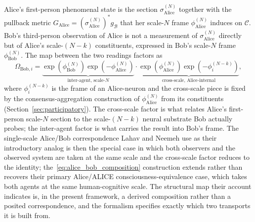 \documentclass[11pt]{article}
\begin{document}
Alice's first-person phenomenal state is the section $\sigma_{\mathrm{Alice}}^{(N)}$ together with the pullback metric $G_{\mathrm{Alice}} = (\sigma_{\mathrm{Alice}}^{(N)})^* g_{\mathcal{B}}$ that her scale-$N$ frame $\phi_{\mathrm{Alice}}^{(N)}$ induces on $\mathcal{C}$. Bob's third-person observation of Alice is not a measurement of $\sigma_{\mathrm{Alice}}^{(N)}$ directly but of Alice's scale-$(N-k)$ constituents, expressed in Bob's scale-$N$ frame $\phi_{\mathrm{Bob}}^{(N)}$. The map between the two readings factors as
\begin{equation}
\Omega_{\mathrm{Bob}, i}
=
\underbrace{\exp(\phi_{\mathrm{Bob}}^{(N)}) \exp(-\phi_{\mathrm{Alice}}^{(N)})}_{\text{inter-agent, scale-}N}
\cdot
\underbrace{\exp(\phi_{\mathrm{Alice}}^{(N)}) \exp(-\phi_{i}^{(N-k)})}_{\text{cross-scale, Alice-internal}},
\label{eq:alice_bob_composition}
\end{equation}
where $\phi_i^{(N-k)}$ is the frame of an Alice-neuron and the cross-scale piece is fixed by the consensus-aggregation construction of $\phi_{\mathrm{Alice}}^{(N)}$ from its constituents (Section~\ref{sec:participatory}). The cross-scale factor is what relates Alice's first-person scale-$N$ section to the scale-$(N-k)$ neural substrate Bob actually probes; the inter-agent factor is what carries the result into Bob's frame. The single-scale Alice/Bob correspondence Lahav and Neemeh use as their introductory analog is then the special case in which both observers and the observed system are taken at the same scale and the cross-scale factor reduces to the identity; the~\eqref{eq:alice_bob_composition} construction extends rather than recovers their primary Alice/ALICE consciousness-equivalence case, which takes both agents at the same human-cognitive scale. The structural map their account indicates is, in the present framework, a derived composition rather than a posited correspondence, and the formalism specifies exactly which two transports it is built from.
\end{document}
